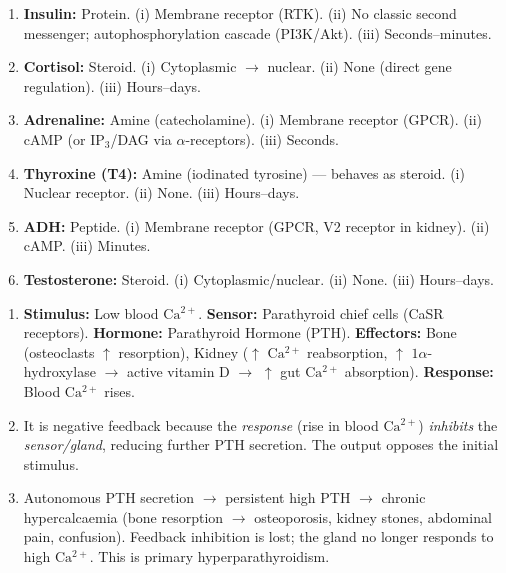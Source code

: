 \documentclass[11pt]{article}
\newcommand{\cle}[1]{{\popxbold\color{popdark}#1}}
\begin{document}
\begin{corrige}[Exercise 1]
\begin{enumerate}
    \item \textbf{Insulin:} Protein. (i) Membrane receptor (RTK). (ii) No classic second messenger; autophosphorylation cascade (PI3K/Akt). (iii) Seconds--minutes.
    \item \textbf{Cortisol:} Steroid. (i) Cytoplasmic $\rightarrow$ nuclear. (ii) None (direct gene regulation). (iii) Hours--days.
    \item \textbf{Adrenaline:} Amine (catecholamine). (i) Membrane receptor (GPCR). (ii) cAMP (or IP$_3$/DAG via $\alpha$-receptors). (iii) Seconds.
    \item \textbf{Thyroxine (T4):} Amine (iodinated tyrosine) — behaves as steroid. (i) Nuclear receptor. (ii) None. (iii) Hours--days.
    \item \textbf{ADH:} Peptide. (i) Membrane receptor (GPCR, V2 receptor in kidney). (ii) cAMP. (iii) Minutes.
    \item \textbf{Testosterone:} Steroid. (i) Cytoplasmic/nuclear. (ii) None. (iii) Hours--days.
\end{enumerate}
\end{corrige}

\begin{corrige}[Exercise 2]
\begin{enumerate}
    \item \textbf{Stimulus:} Low blood $\mathrm{Ca^{2+}}$. \textbf{Sensor:} Parathyroid chief cells (CaSR receptors). \textbf{Hormone:} Parathyroid Hormone (PTH). \textbf{Effectors:} Bone (osteoclasts $\uparrow$ resorption), Kidney ($\uparrow$ $\mathrm{Ca^{2+}}$ reabsorption, $\uparrow$ $1\alpha$-hydroxylase $\rightarrow$ active vitamin D $\rightarrow$ $\uparrow$ gut $\mathrm{Ca^{2+}}$ absorption). \textbf{Response:} Blood $\mathrm{Ca^{2+}}$ rises.
    \item It is negative feedback because the \emph{response} (rise in blood $\mathrm{Ca^{2+}}$) \emph{inhibits} the \emph{sensor/gland}, reducing further PTH secretion. The output opposes the initial stimulus.
    \item Autonomous PTH secretion $\rightarrow$ persistent high PTH $\rightarrow$ chronic hypercalcaemia (bone resorption $\rightarrow$ osteoporosis, kidney stones, abdominal pain, confusion). Feedback inhibition is lost; the gland no longer responds to high $\mathrm{Ca^{2+}}$. This is \cle{primary hyperparathyroidism}.
\end{enumerate}
\end{corrige}
\end{document}
